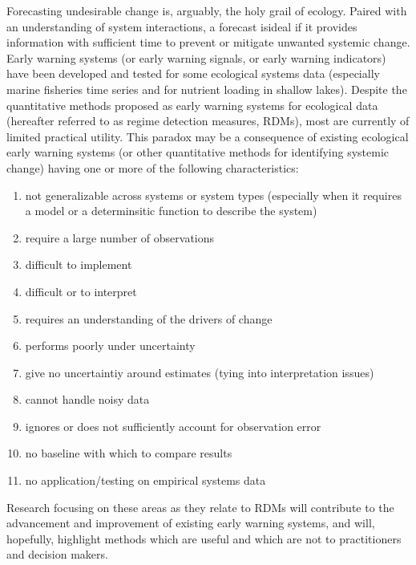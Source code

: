 \documentclass[12pt,twoside,openany]{reedthesis}
\providecommand{\tightlist}{%
  \setlength{\itemsep}{0pt}\setlength{\parskip}{0pt}}
\begin{document}
Forecasting undesirable change is, arguably, the holy grail of ecology. Paired with an understanding of system interactions, a forecast isideal if it provides information with sufficient time to prevent or mitigate unwanted systemic change. Early warning systems (or early warning signals, or early warning indicators) have been developed and tested for some ecological systems data (especially marine fisheries time series and for nutrient loading in shallow lakes). Despite the quantitative methods proposed as early warning systems for ecological data (hereafter referred to as regime detection measures, RDMs), most are currently of limited practical utility. This paradox may be a consequence of existing ecological early warning systems (or other quantitative methods for identifying systemic change) having one or more of the following characteristics:
\begin{enumerate}
\def\labelenumi{\arabic{enumi}.}
\tightlist
\item
  not generalizable across systems or system types (especially when it requires a model or a determinsitic function to describe the system)
\item
  require a large number of observations\\
\item
  difficult to implement\\
\item
  difficult or to interpret\\
\item
  requires an understanding of the drivers of change\\
\item
  performs poorly under uncertainty
\item
  give no uncertaintiy around estimates (tying into interpretation issues)\\
\item
  cannot handle noisy data
\item
  ignores or does not sufficiently account for observation error\\
\item
  no baseline with which to compare results
\item
  no application/testing on empirical systems data
\end{enumerate}
Research focusing on these areas as they relate to RDMs will contribute to the advancement and improvement of existing early warning systems, and will, hopefully, highlight methods which are useful and which are not to practitioners and decision makers.
\end{document}
